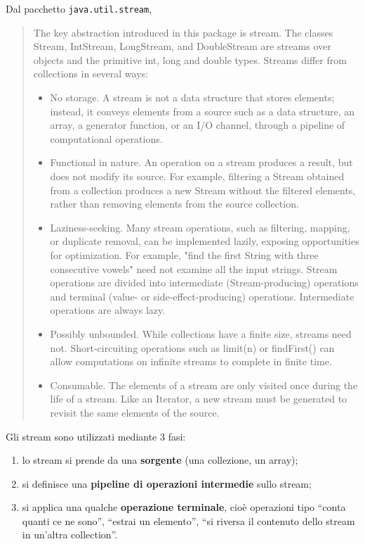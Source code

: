 \documentclass[\fontsizeclass,twocolumn]{\classname}
\theoremstyle{definition}
\theoremstyle{definition}
\begin{document}
Dal pacchetto \texttt{java.util.stream},
\begin{quote}
    \footnotesize{The key abstraction introduced in this package is stream. The classes Stream, IntStream, LongStream, and DoubleStream are streams over objects and the primitive int, long and double types. Streams differ from collections in several ways:

\begin{itemize}
    \item 
    No storage. A stream is not a data structure that stores elements; instead, it conveys elements from a source such as a data structure, an array, a generator function, or an I/O channel, through a pipeline of computational operations.
\item Functional in nature. An operation on a stream produces a result, but does not modify its source. For example, filtering a Stream obtained from a collection produces a new Stream without the filtered elements, rather than removing elements from the source collection.
\item Laziness-seeking. Many stream operations, such as filtering, mapping, or duplicate removal, can be implemented lazily, exposing opportunities for optimization. For example, "find the first String with three consecutive vowels" need not examine all the input strings. Stream operations are divided into intermediate (Stream-producing) operations and terminal (value- or side-effect-producing) operations. Intermediate operations are always lazy.
\item Possibly unbounded. While collections have a finite size, streams need not. Short-circuiting operations such as limit(n) or findFirst() can allow computations on infinite streams to complete in finite time.
\item Consumable. The elements of a stream are only visited once during the life of a stream. Like an Iterator, a new stream must be generated to revisit the same elements of the source.
\end{itemize}


}
\end{quote}

Gli stream sono utilizzati mediante 3 fasi:
\begin{enumerate}
    \item lo stream si prende da una \textbf{sorgente} (una collezione, un
        array);
    \item si definisce una \textbf{pipeline di operazioni intermedie} sullo
        stream;
    \item si applica una qualche \textbf{operazione terminale}, cioè operazioni
        tipo ``conta quanti ce ne sono'', ``estrai un elemento'', ``si riversa
        il contenuto dello stream in un'altra collection''.
\end{enumerate}
\end{document}
